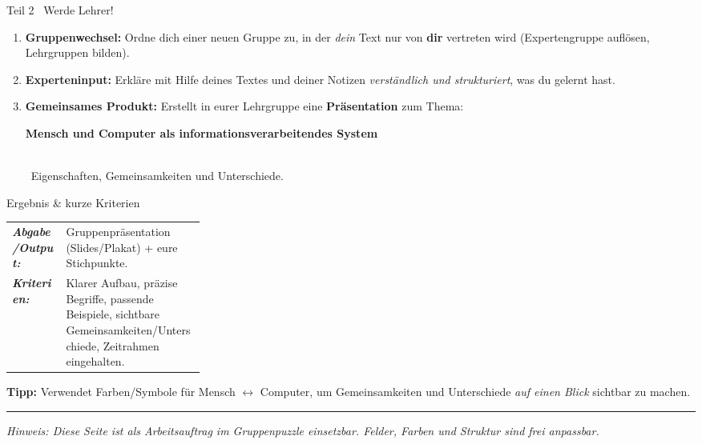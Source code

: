 \documentclass[11pt,a4paper]{scrartcl}
\newcommand{\blatttyp}{Arbeitsauftrag}
\begin{document}
\begin{teilbox}{Teil 2 \textemdash\ Werde Lehrer!}
\begin{enumerate}[label=\roman*)]
  \item \textbf{Gruppenwechsel:} Ordne dich einer neuen Gruppe zu, in der \emph{dein} Text nur von \textbf{dir} vertreten wird (Expertengruppe auflösen, Lehrgruppen bilden).
  \item \textbf{Experteninput:} Erkläre mit Hilfe deines Textes und deiner Notizen \emph{verständlich und strukturiert}, was du gelernt hast. \\
  \item \textbf{Gemeinsames Produkt:} Erstellt in eurer Lehrgruppe eine \textbf{Präsentation} zum Thema:\\[2pt]
  \centerline{\textbf{Mensch und Computer als informationsverarbeitendes System}}\\ \textemdash\ Eigenschaften, Gemeinsamkeiten und Unterschiede.
\end{enumerate}
\end{teilbox}

\begin{infobox}{Ergebnis \& kurze Kriterien}
\begin{tabularx}{\linewidth}{@{}>{\bfseries}p{0.28\linewidth}X@{}}
\textit{Abgabe/Output:} & Gruppenpräsentation (Slides/Plakat) + eure Stichpunkte.\\
\textit{Kriterien:} & Klarer Aufbau, präzise Begriffe, passende Beispiele, sichtbare Gemeinsamkeiten/Unterschiede, Zeitrahmen eingehalten.\\
\end{tabularx}
\end{infobox}

\begin{hinweisbox}
\textbf{Tipp:} Verwendet Farben/Symbole für Mensch \(\leftrightarrow\) Computer, um Gemeinsamkeiten und Unterschiede \emph{auf einen Blick} sichtbar zu machen.
\end{hinweisbox}

\vfill
\hrule
\small\emph{Hinweis: Diese Seite ist als \blatttyp{} im Gruppenpuzzle einsetzbar. Felder, Farben und Struktur sind frei anpassbar.}
\end{document}
